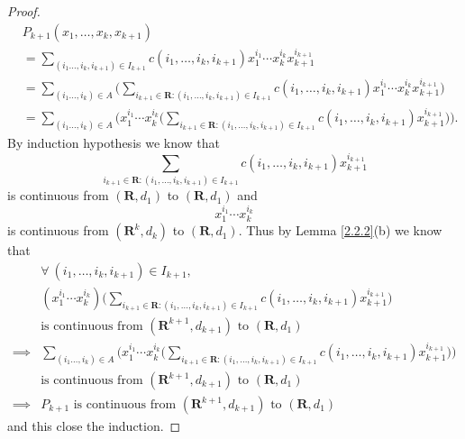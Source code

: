 \begin{proof}
    \begin{align*}
         & P_{k + 1}(x_1, \dots, x_k, x_{k + 1})                                                                                                                                                                                \\
         & = \sum_{(i_1 \dots, i_k, i_{k + 1}) \in I_{k + 1}} c(i_1, \dots, i_k, i_{k + 1}) x_1^{i_1} \cdots x_k^{i_k} x_{k + 1}^{i_{k + 1}}                                                                                    \\
         & = \sum_{(i_1 \dots, i_k) \in A} \bigg(\sum_{i_{k + 1} \in \mathbf{R} : (i_1, \dots, i_k, i_{k + 1}) \in I_{k + 1}} c(i_1, \dots, i_k, i_{k + 1}) x_1^{i_1} \cdots x_k^{i_k} x_{k + 1}^{i_{k + 1}}\bigg)              \\
         & = \sum_{(i_1 \dots, i_k) \in A} \Bigg(x_1^{i_1} \cdots x_k^{i_k} \bigg(\sum_{i_{k + 1} \in \mathbf{R} : (i_1, \dots, i_k, i_{k + 1}) \in I_{k + 1}} c(i_1, \dots, i_k, i_{k + 1}) x_{k + 1}^{i_{k + 1}}\bigg)\Bigg).
    \end{align*}
    By induction hypothesis we know that
    \[
        \sum_{i_{k + 1} \in \mathbf{R} : (i_1, \dots, i_k, i_{k + 1}) \in I_{k + 1}} c(i_1, \dots, i_k, i_{k + 1}) x_{k + 1}^{i_{k + 1}}
    \]
    is continuous from \((\mathbf{R}, d_1)\) to \((\mathbf{R}, d_1)\) and
    \[
        x_1^{i_1} \cdots x_k^{i_k}
    \]
    is continuous from \((\mathbf{R}^k, d_k)\) to \((\mathbf{R}, d_1)\).
    Thus by Lemma \ref{2.2.2}(b) we know that
    \begin{align*}
                 & \forall\ (i_1, \dots, i_k, i_{k + 1}) \in I_{k + 1},                                                                                                                                                              \\
                 & (x_1^{i_1} \cdots x_k^{i_k}) \bigg(\sum_{i_{k + 1} \in \mathbf{R} : (i_1, \dots, i_k, i_{k + 1}) \in I_{k + 1}} c(i_1, \dots, i_k, i_{k + 1}) x_{k + 1}^{i_{k + 1}}\bigg)                                         \\
                 & \text{is continuous from } (\mathbf{R}^{k + 1}, d_{k + 1}) \text{ to } (\mathbf{R}, d_1)                                                                                                                          \\
        \implies & \sum_{(i_1 \dots, i_k) \in A} \Bigg(x_1^{i_1} \cdots x_k^{i_k} \bigg(\sum_{i_{k + 1} \in \mathbf{R} : (i_1, \dots, i_k, i_{k + 1}) \in I_{k + 1}} c(i_1, \dots, i_k, i_{k + 1}) x_{k + 1}^{i_{k + 1}}\bigg)\Bigg) \\
                 & \text{is continuous from } (\mathbf{R}^{k + 1}, d_{k + 1}) \text{ to } (\mathbf{R}, d_1)                                                                                                                          \\
        \implies & P_{k + 1} \text{ is continuous from } (\mathbf{R}^{k + 1}, d_{k + 1}) \text{ to } (\mathbf{R}, d_1)
    \end{align*}
    and this close the induction.
\end{proof}

